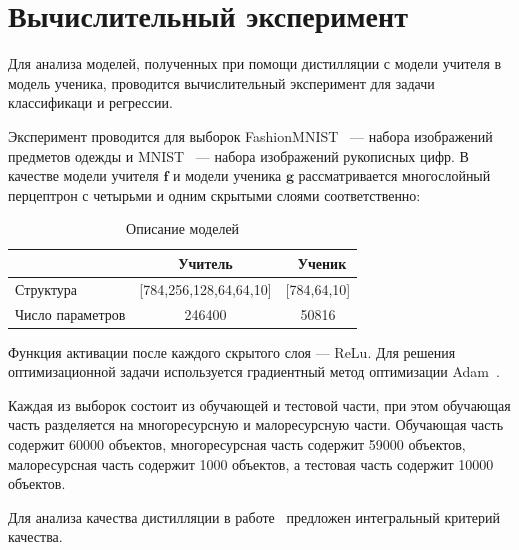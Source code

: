 \newpage

\section{Вычислительный эксперимент}

Для анализа моделей, полученных при помощи дистилляции с модели учителя в модель ученика, проводится вычислительный эксперимент для задачи классификаци и регрессии.

Эксперимент проводится для выборок FashionMNIST~\cite{FMNIST} --- набора изображений предметов одежды и MNIST~\cite{MNIST} --- набора изображений рукописных цифр. В качестве модели учителя $\textbf{f}$ и модели ученика $\textbf{g}$ рассматривается многослойный перцептрон с четырьми и одним скрытыми слоями соответственно:

\begin{table}[h!t]
\begin{center}
\caption{Описание моделей}
\label{table_1}
\begin{tabular}{|c|c|c|}
\hline
	 & Учитель &\ Ученик\\
	\hline
	\multicolumn{1}{|l|}{Структура}
	& [784,256,128,64,64,10]& [784,64,10]\\
	\hline
	\multicolumn{1}{|l|}{Число параметров}
	& 246400 & 50816\\
\hline

\end{tabular}
\end{center}
\end{table}

Функция активации после каждого скрытого слоя --- ReLu. Для решения оптимизационной задачи используется градиентный метод оптимизации Adam~\cite{Adam}.

Каждая из выборок состоит из обучающей и тестовой части, при этом обучающая часть разделяется на многоресурсную и малоресурсную части. Обучающая часть содержит 60000 объектов, многоресурсная часть содержит 59000 объектов, малоресурсная часть содержит 1000 объектов, а тестовая часть содержит 10000 объектов.

Для анализа качества дистилляции в работе~\cite{Grabovoy2022} предложен интегральный критерий качества.

